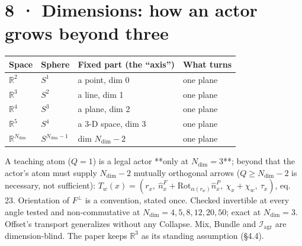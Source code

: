 \documentclass[10.5pt]{article}
\begin{document}
\section*{8 · Dimensions: how an actor grows beyond three}
{\small\setlength{\tabcolsep}{4pt}\begin{longtable}{L{2.6cm}L{2.4cm}L{5.0cm}L{2.6cm}}
\toprule
\textbf{Space} & \textbf{Sphere} & \textbf{Fixed part (the “axis”)} & \textbf{What turns} \\
\midrule
\endhead
$\mathbb R^2$ & $S^1$ & a point, dim 0 & one plane \\
$\mathbb R^3$ & $S^2$ & a line, dim 1 & one plane \\
$\mathbb R^4$ & $S^3$ & a plane, dim 2 & one plane \\
$\mathbb R^5$ & $S^4$ & a 3-D space, dim 3 & one plane \\
$\mathbb R^{N_{\mathrm{dim}}}$ & $S^{N_{\mathrm{dim}}-1}$ & dim $N_{\mathrm{dim}}-2$ & one plane \\
\bottomrule
\end{longtable}}
A teaching atom ($Q=1$) is a legal actor **only at $N_{\mathrm{dim}}=3$**; beyond that the actor's atom must supply $N_{\mathrm{dim}}-2$ mutually orthogonal arrows ($Q\ge N_{\mathrm{dim}}-2$ is necessary, not sufficient): $T_w(x)=(r_x,\ \hat n_x^F+\mathrm{Rot}_{\alpha(r_w)}\hat n_x^{P},\ \chi_x+\chi_w,\ \tau_x)$, eq. 23. Orientation of $F^\perp$ is a convention, stated once. Checked invertible at every angle tested and non-commutative at $N_{\mathrm{dim}}=4,5,8,12,20,50$; exact at $N_{\mathrm{dim}}=3$. Offset's transport generalizes without any Collapse. Mix, Bundle and $\mathcal{I}_{\mathrm{agr}}$ are dimension-blind. The paper keeps $\mathbb R^3$ as its standing assumption (§4.4).
\end{document}
